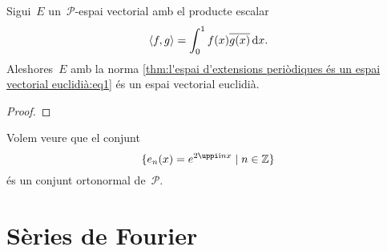 \documentclass[../../main.tex]{subfiles}
\begin{document}
    \begin{theorem}
        \label{thm:l'espai d'extensions periòdiques és un espai vectorial euclidià}
        Sigui~\(E\) un~\(\mathcal{P}\)-espai vectorial amb el producte escalar
        \begin{equation}
            \label{thm:l'espai d'extensions periòdiques és un espai vectorial euclidià:eq1}
            \langle f,g\rangle=\int_{0}^{1}f(x)\overline{g(x)}\mathop{}\!\mathrm{d} x.
        \end{equation}
        Aleshores~\(E\) amb la norma \eqref{thm:l'espai d'extensions periòdiques és un espai vectorial euclidià:eq1} és un espai vectorial euclidià.
        \begin{proof}
        \end{proof}
    \end{theorem}
    \begin{example}
        \label{ex:base ortonormal de les extensions periòdiques}
        Volem veure que el conjunt
        \[
            \{e_{n}(x)=e^{2\uppi\iu nx}\mid n\in\mathbb{Z}\}
        \]
        és un conjunt ortonormal de~\(\mathcal{P}\).
        \begin{solution}
        \end{solution}
    \end{example}
\section{Sèries de Fourier}
\end{document}
